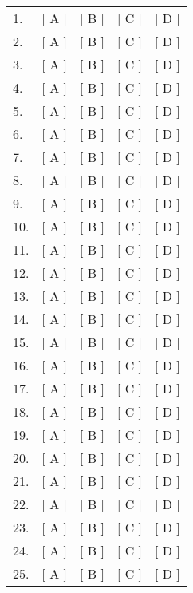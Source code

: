 \documentclass[addpoints,9pt]{exam}
\begin{document}
\else

\begin{multicols}{2}

\begin{tabular}{lcccc}\\
  1. & [ A ] & [ B ] & [ C ] & [ D ] \\
  2. & [ A ] & [ B ] & [ C ] & [ D ] \\
  3. & [ A ] & [ B ] & [ C ] & [ D ] \\
  4. & [ A ] & [ B ] & [ C ] & [ D ] \\
  5. & [ A ] & [ B ] & [ C ] & [ D ] \\
  6. & [ A ] & [ B ] & [ C ] & [ D ] \\
  7. & [ A ] & [ B ] & [ C ] & [ D ] \\
  8. & [ A ] & [ B ] & [ C ] & [ D ] \\
  9. & [ A ] & [ B ] & [ C ] & [ D ] \\
  10. & [ A ] & [ B ] & [ C ] & [ D ] \\
  11. & [ A ] & [ B ] & [ C ] & [ D ] \\
  12. & [ A ] & [ B ] & [ C ] & [ D ] \\
  13. & [ A ] & [ B ] & [ C ] & [ D ] \\
  14. & [ A ] & [ B ] & [ C ] & [ D ] \\
  15. & [ A ] & [ B ] & [ C ] & [ D ] \\
  16. & [ A ] & [ B ] & [ C ] & [ D ] \\
  17. & [ A ] & [ B ] & [ C ] & [ D ] \\
  18. & [ A ] & [ B ] & [ C ] & [ D ] \\
  19. & [ A ] & [ B ] & [ C ] & [ D ] \\
  20. & [ A ] & [ B ] & [ C ] & [ D ] \\
  21. & [ A ] & [ B ] & [ C ] & [ D ] \\
  22. & [ A ] & [ B ] & [ C ] & [ D ] \\
  23. & [ A ] & [ B ] & [ C ] & [ D ] \\
  24. & [ A ] & [ B ] & [ C ] & [ D ] \\
  25. & [ A ] & [ B ] & [ C ] & [ D ] \\
\end{tabular}

\columnbreak


\end{multicols}
\end{document}
